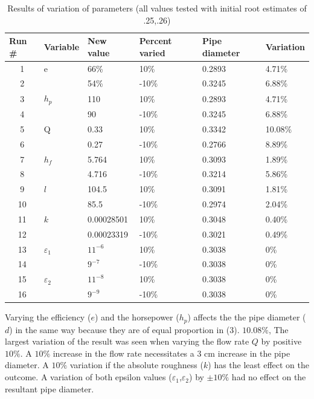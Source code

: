 \documentclass[titlepage,11pt]{article}
\begin{document}
\begin{table}[!h]
\caption{Results of variation of parameters (all values tested with
initial root estimates of .25,.26)}
\begin{center}
\begin{tabular}{|c|l|l|l|l|l|}\hline
\multicolumn{1}{|l|}{\bf Run \#} & \multicolumn{1}{l}{\bf Variable}
& \bf New value & \bf Percent varied & \bf Pipe diameter &
\multicolumn{1}{c|}{\bf Variation} \\ \hline
1 & e & 66\% & 10\% & 0.2893 & 4.71\% \\
2 &  & 54\% & -10\% & 0.3245 & 6.88\% \\ \hline
3 & $h_p$ & 110 & 10\% & 0.2893 & 4.71\% \\
4 &  & 90 & -10\% & 0.3245 & 6.88\% \\ \hline
5 & Q & 0.33 & 10\% & 0.3342 & 10.08\% \\
6 &  & 0.27 & -10\% & 0.2766 & 8.89\% \\ \hline
7 & $h_f$ & 5.764 & 10\% & 0.3093 & 1.89\% \\
8 &  & 4.716 & -10\% & 0.3214 & 5.86\% \\ \hline
9 & $l$ & 104.5 & 10\% & 0.3091 & 1.81\% \\
10 &  & 85.5 & -10\% & 0.2974 & 2.04\% \\ \hline
11 & $k$ & 0.00028501 & 10\% & 0.3048 & 0.40\% \\
12 &  & 0.00023319 & -10\% & 0.3021 & 0.49\% \\ \hline
13 & $\varepsilon_1$ & $11^{-6}$ & 10\% & 0.3038 & 0\% \\
14 &  & $9^{-7}$ & -10\% & 0.3038 & 0\% \\ \hline
15 & $\varepsilon_2$ & $11^{-8}$ & 10\% & 0.3038 & 0\% \\
16 &  & $9^{-9}$ & -10\% & 0.3038 & 0\% \\ \hline
\end{tabular}
\end{center}
\end{table}

Varying the efficiency ($e$) and the horsepower ($h_p$) affects the
the pipe diameter ($d$) in the same way because they are of equal
proportion in (3). $10.08\%$, The largest variation of the result
was seen when varying the flow rate $Q$ by positive $10\%$.  A
$10\%$ increase in the flow rate necessitates a 3 cm increase in the
pipe diameter. A $10\%$ variation if the absolute roughness ($k$)
has the least effect on the outcome.  A variation of both epsilon
values ($\varepsilon_1$,$\varepsilon_2$) by $\pm10\%$ had no effect
on the resultant pipe diameter.
\newpage
\end{document}
